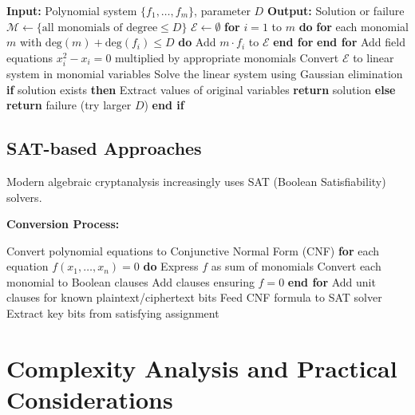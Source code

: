 \documentclass[12pt,a4paper]{article}
\newcommand{\degree}{\text{deg}}
\begin{document}
\begin{algorithmbox}[title=XL Algorithm]
\begin{algorithmic}[1]
\STATE \textbf{Input:} Polynomial system $\{f_1, \ldots, f_m\}$, parameter $D$
\STATE \textbf{Output:} Solution or failure
\STATE
\STATE $\mathcal{M} \leftarrow \{\text{all monomials of degree} \leq D\}$
\STATE $\mathcal{E} \leftarrow \emptyset$
\STATE \textbf{for} $i = 1$ to $m$ \textbf{do}
\STATE \quad \textbf{for} each monomial $m$ with $\degree(m) + \degree(f_i) \leq D$ \textbf{do}
\STATE \quad \quad Add $m \cdot f_i$ to $\mathcal{E}$
\STATE \quad \textbf{end for}
\STATE \textbf{end for}
\STATE Add field equations $x_i^2 - x_i = 0$ multiplied by appropriate monomials
\STATE Convert $\mathcal{E}$ to linear system in monomial variables
\STATE Solve the linear system using Gaussian elimination
\STATE \textbf{if} solution exists \textbf{then}
\STATE \quad Extract values of original variables
\STATE \quad \textbf{return} solution
\STATE \textbf{else}
\STATE \quad \textbf{return} failure (try larger $D$)
\STATE \textbf{end if}
\end{algorithmic}
\end{algorithmbox}

\subsection{SAT-based Approaches}

Modern algebraic cryptanalysis increasingly uses SAT (Boolean Satisfiability) solvers.

\begin{algorithmbox}[title=SAT-based Algebraic Attack]
\textbf{Conversion Process:}
\begin{algorithmic}[1]
\STATE Convert polynomial equations to Conjunctive Normal Form (CNF)
\STATE \textbf{for} each equation $f(x_1, \ldots, x_n) = 0$ \textbf{do}
\STATE \quad Express $f$ as sum of monomials
\STATE \quad Convert each monomial to Boolean clauses
\STATE \quad Add clauses ensuring $f = 0$
\STATE \textbf{end for}
\STATE Add unit clauses for known plaintext/ciphertext bits
\STATE Feed CNF formula to SAT solver
\STATE Extract key bits from satisfying assignment
\end{algorithmic}
\end{algorithmbox}

\section{Complexity Analysis and Practical Considerations}
\end{document}
